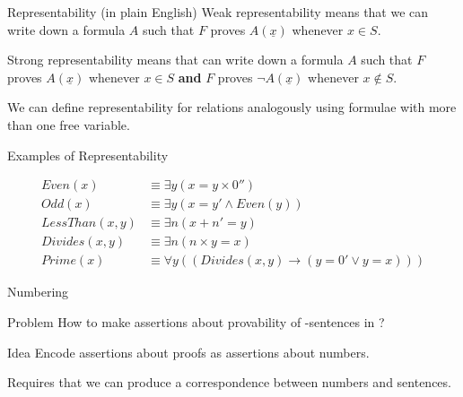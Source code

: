 \documentclass{beamer}
\begin{document}
\begin{frame}{Representability (in plain English)}
  Weak representability means that we can write down a formula $A$ such that
  $F$ proves $A(\underline{x})$ whenever $x \in S$.

  \pause

  Strong representability means that can write down a formula $A$ such that $F$
  proves $A(\underline{x})$ whenever $x \in S$ \textbf{and} $F$ proves
  $\neg A(\underline{x})$ whenever $x \notin S$.

  \pause

  We can define representability for relations analogously using formulae with
  more than one free variable.
\end{frame}

\begin{frame}{Examples of Representability}

  \begin{align*}
    Even(x) & \equiv \exists y (x = y \times 0'') \\
    Odd(x) & \equiv \exists y(x = y' \land Even(y)) \\
    LessThan(x, y) & \equiv \exists n (x + n' = y) \\
    Divides(x, y) & \equiv \exists n (n \times y = x) \\
    Prime(x) & \equiv \forall y((Divides(x, y) \rightarrow (y = 0' \lor y = x)))
  \end{align*}

\end{frame}

\begin{frame}{\godel{} Numbering}
  \begin{block}{Problem}
    How to make assertions about provability of \robinson{}-sentences in
    \robinson{}?
  \end{block}

  \pause

  \begin{block}{Idea}
    Encode assertions about proofs as assertions about numbers.
  \end{block}

  \pause

  Requires that we can produce a correspondence between numbers and sentences.

\end{frame}
\end{document}
